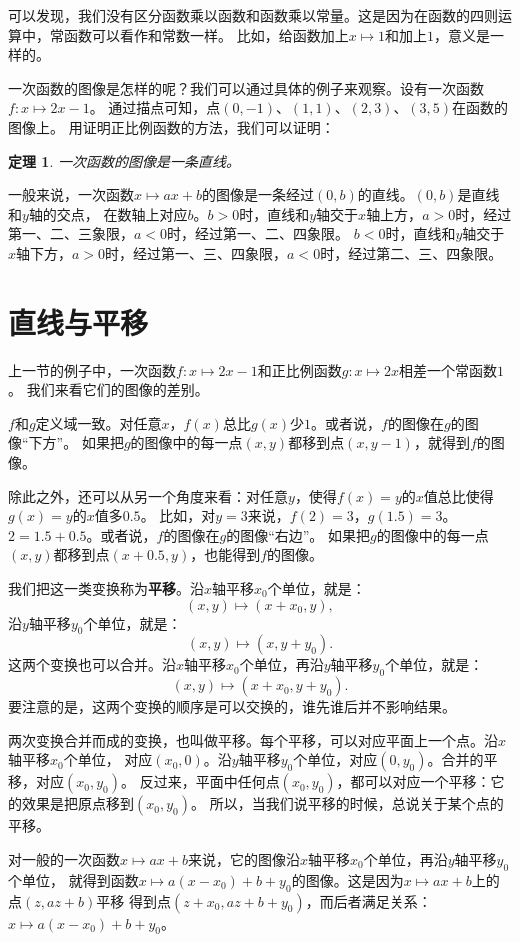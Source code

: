 \documentclass[12pt,UTF8]{ctexbook}
\newtheorem{tm}{定理}[section]
\begin{document}
可以发现，我们没有区分函数乘以函数和函数乘以常量。这是因为在函数的四则运算中，常函数可以看作和常数一样。
比如，给函数加上$x\mapsto 1$和加上$1$，意义是一样的。

一次函数的图像是怎样的呢？我们可以通过具体的例子来观察。设有一次函数$f: x\mapsto 2x - 1$。
通过描点可知，点$(0, -1)$、$(1, 1)$、$(2, 3)$、$(3, 5)$在函数的图像上。
用证明正比例函数的方法，我们可以证明：

\begin{tm}\label{tm:5-1-0}
    一次函数的图像是一条直线。
\end{tm}

一般来说，一次函数$x\mapsto ax + b$的图像是一条经过$(0, b)$的直线。$(0, b)$是直线和$y$轴的交点，
在数轴上对应$b$。$b>0$时，直线和$y$轴交于$x$轴上方，$a>0$时，经过第一、二、三象限，$a<0$时，经过第一、二、四象限。
$b<0$时，直线和$y$轴交于$x$轴下方，$a>0$时，经过第一、三、四象限，$a<0$时，经过第二、三、四象限。

\section{直线与平移}
上一节的例子中，一次函数$f: x\mapsto 2x - 1$和正比例函数$g: x\mapsto 2x$相差一个常函数$1$。
我们来看它们的图像的差别。

$f$和$g$定义域一致。对任意$x$，$f(x)$总比$g(x)$少$1$。或者说，$f$的图像在$g$的图像“下方”。
如果把$g$的图像中的每一点$(x, y)$都移到点$(x, y-1)$，就得到$f$的图像。

除此之外，还可以从另一个角度来看：对任意$y$，使得$f(x)=y$的$x$值总比使得$g(x)=y$的$x$值多$0.5$。
比如，对$y=3$来说，$f(2)=3$，$g(1.5)=3$。$2=1.5+0.5$。或者说，$f$的图像在$g$的图像“右边”。
如果把$g$的图像中的每一点$(x, y)$都移到点$(x+0.5, y)$，也能得到$f$的图像。

我们把这一类变换称为\textbf{平移}。沿$x$轴平移$x_0$个单位，就是：
$$ (x, y) \mapsto (x+x_0, y),$$
沿$y$轴平移$y_0$个单位，就是：
$$ (x, y) \mapsto (x, y+y_0).$$
这两个变换也可以合并。沿$x$轴平移$x_0$个单位，再沿$y$轴平移$y_0$个单位，就是：
$$ (x, y) \mapsto (x+x_0, y+y_0).$$
要注意的是，这两个变换的顺序是可以交换的，谁先谁后并不影响结果。

两次变换合并而成的变换，也叫做平移。每个平移，可以对应平面上一个点。沿$x$轴平移$x_0$个单位，
对应$(x_0, 0)$。沿$y$轴平移$y_0$个单位，对应$(0, y_0)$。合并的平移，对应$(x_0, y_0)$。
反过来，平面中任何点$(x_0, y_0)$，都可以对应一个平移：它的效果是把原点移到$(x_0, y_0)$。
所以，当我们说平移的时候，总说关于某个点的平移。

对一般的一次函数$x\mapsto ax+b$来说，它的图像沿$x$轴平移$x_0$个单位，再沿$y$轴平移$y_0$个单位，
就得到函数$x\mapsto a(x-x_0)+b+y_0$的图像。这是因为$x\mapsto ax+b$上的点$(z, az+b)$平移
得到点$(z+x_0, az+b+y_0)$，而后者满足关系：$x\mapsto a(x-x_0)+b+y_0$。
\end{document}
